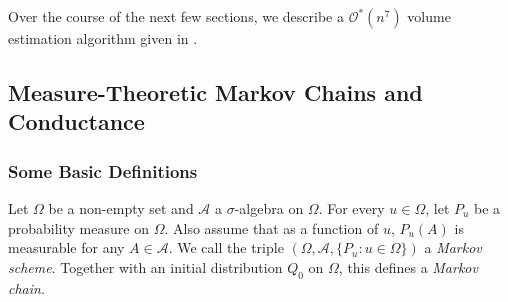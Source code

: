 





Over the course of the next few sections, we describe a $\mathcal{O}^*(n^7)$ volume estimation algorithm given in \cite{lov-sim-on7}.

\subsection{Measure-Theoretic Markov Chains and Conductance}
\label{subsec: measure theoretic markov chains}

\subsubsection{Some Basic Definitions}

\begin{fdef}
	Let $\Omega$ be a non-empty set and $\mathcal{A}$ a $\sigma$-algebra on $\Omega$. For every $u\in\Omega$, let $P_u$ be a probability measure on $\Omega$. Also assume that as a function of $u$, $P_u(A)$ is measurable for any $A\in\mathcal{A}$. We call the triple $(\Omega,\mathcal{A},\{P_u:u\in\Omega\})$ a \textit{Markov scheme}. Together with an initial distribution $Q_0$ on $\Omega$, this defines a \textit{Markov chain}.
\end{fdef}

